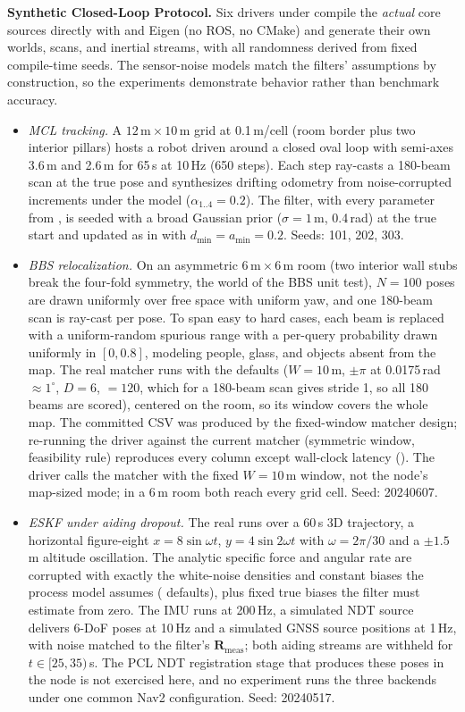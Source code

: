 \noindent\textbf{Synthetic Closed-Loop Protocol.} Six drivers under  compile the \emph{actual} core sources directly with  and Eigen (no ROS, no CMake) and generate their own worlds, scans, and inertial streams, with all randomness derived from fixed compile-time seeds. The sensor-noise models match the filters' assumptions by construction, so the experiments demonstrate behavior rather than benchmark accuracy.
\begin{itemize}
  \item \emph{MCL tracking.} A $12\,\mathrm{m}\times10\,\mathrm{m}$ grid at 0.1\,m/cell (room border plus two interior pillars) hosts a robot driven around a closed oval loop with semi-axes 3.6\,m and 2.6\,m for 65\,s at 10\,Hz (650 steps). Each step ray-casts a 180-beam scan at the true pose and synthesizes drifting odometry from noise-corrupted increments under the  model ($\alpha_{1..4}=0.2$). The filter, with every parameter from , is seeded with a broad Gaussian prior ($\sigma=1$\,m, 0.4\,rad) at the true start and updated as in  with $d_{\min}=a_{\min}=0.2$. Seeds: 101, 202, 303.
  \item \emph{BBS relocalization.} On an asymmetric $6\,\mathrm{m}\times6\,\mathrm{m}$ room (two interior wall stubs break the four-fold symmetry, the world of the BBS unit test), $N=100$ poses are drawn uniformly over free space with uniform yaw, and one 180-beam scan is ray-cast per pose. To span easy to hard cases, each beam is replaced with a uniform-random spurious range with a per-query probability drawn uniformly in $[0,0.8]$, modeling people, glass, and objects absent from the map. The real matcher runs with the  defaults ($W=10$\,m, $\pm\pi$ at 0.0175\,rad $\approx1^\circ$, $D=6$, ${}=120$, which for a 180-beam scan gives stride 1, so all 180 beams are scored), centered on the room, so its window covers the whole map. The committed CSV was produced by the fixed-window matcher design; re-running the driver against the current matcher (symmetric window, feasibility rule) reproduces every column except wall-clock latency (). The driver calls the matcher with the fixed $W=10$\,m window, not the node's map-sized mode; in a 6\,m room both reach every grid cell. Seed: 20240607.
  \item \emph{ESKF under aiding dropout.} The real  runs over a 60\,s 3D trajectory, a horizontal figure-eight $x=8\sin\omega t$, $y=4\sin2\omega t$ with $\omega=2\pi/30$ and a $\pm1.5$\,m altitude oscillation. The analytic specific force and angular rate are corrupted with exactly the white-noise densities and constant biases the process model assumes ( defaults), plus fixed true biases the filter must estimate from zero. The IMU runs at 200\,Hz, a simulated NDT source delivers 6-DoF poses at 10\,Hz and a simulated GNSS source positions at 1\,Hz, with noise matched to the filter's $\mathbf{R}_{\mathrm{meas}}$; both aiding streams are withheld for $t\in[25,35)$\,s. The PCL NDT registration stage that produces these poses in the node is not exercised here, and no experiment runs the three backends under one common Nav2 configuration. Seed: 20240517.

\end{itemize}

